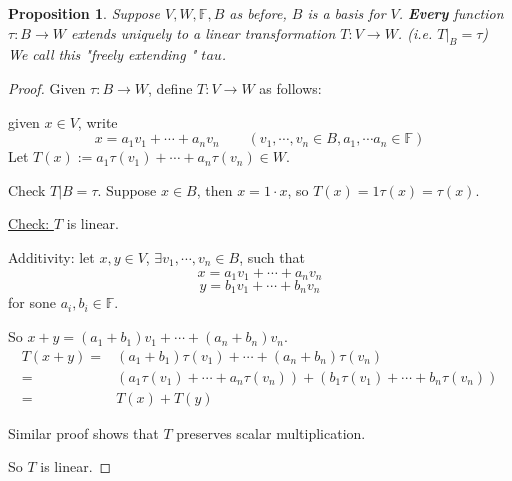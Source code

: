 \documentclass[12pt]{article}
\theoremstyle{plain}
\newtheorem{proposition}{Proposition}[subsection]
\newcommand{\mF}{{\mathbb{F}}}
\begin{document}
	\begin{proposition}
		Suppose $V,W, \mF, B$ as before, $B$ is a basis for $V$. 
		\textbf{Every} function $\tau : B\to W$ extends uniquely to a linear 
		transformation $T: V \to W$. 
		(i.e. $T|_B = \tau$) We call this "freely extending " $tau$. 
	\end{proposition}
	\begin{proof}
		Given $\tau: B \to W$, define $T:V \to W$ as follows: 
		
		given $x \in V$, write 
		\[
			x = a_1v_1+\cdots+a_nv_n \qquad (v_1,\cdots, v_n \in B, a_1,\cdots
			a_n \in \mF)
		\]
		Let $T(x):= a_1\tau(v_1) + \cdots + a_n\tau(v_n) \in W$. 

		Check $T|B = \tau$. Suppose $x \in B$, then $x = 1\cdot x$, so 
		$T(x) = 1\tau (x) = \tau (x)$. 

		\underline{Check: } $T$ is linear. 
		\begin{description}
			\item Additivity: 
				let $x, y \in V$, $\exists v_1,\cdots,v_n\in B$,
				such that 
				\[
					x = a_1v_1 + \cdots + a_nv_n
				\]
				\[
					y = b_1v_1 + \cdots + b_nv_n
				\]
				for sone $a_i, b_i \in \mF$. 
				
				So $x + y = (a_1+b_1)v_1+\cdots + (a_n+b_n)v_n$. 
				\begin{align*}
					T(x+y)
					=&(a_1+b_1)\tau(v_1) + \cdots + (a_n + b_n)\tau(v_n)
					\tag{def of T}\\
					=&(a_1\tau(v_1)+\cdots+a_n\tau(v_n)) + 
					(b_1\tau(v_1)+\cdots+b_n\tau(v_n))\\
					=& T(x) + T(y) \tag{def of T}
				\end{align*}
			\item Similar proof shows that $T$ preserves scalar multiplication. 
		\end{description}
		So $T$ is linear. 
	\end{proof}
\end{document}
